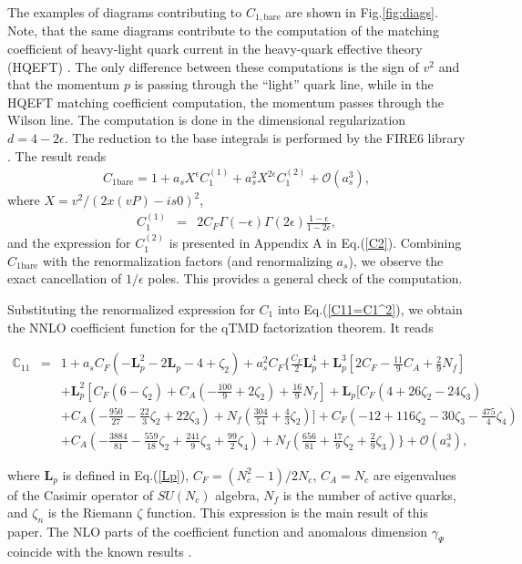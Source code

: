 \documentclass[aps,prl,twocolumn,secnumarabic,notitlepage,superscriptaddress,nofootinbib,tightenlines,floatfix,preprintnumbers]{revtex4-1}
\newcommand{\nn}{\nonumber}
\renewcommand{\(}{\left(}
\renewcommand{\)}{\right)}
\renewcommand{\[}{\left[}
\renewcommand{\]}{\right]}
\begin{document}
The examples of diagrams contributing to $C_{1,\text{bare}}$ are shown in Fig.\ref{fig:diags}. Note, that the same diagrams contribute to the computation of the matching coefficient of heavy-light quark current in the heavy-quark effective theory (HQEFT) \cite{Broadhurst:1994se}. The only difference between these computations is the sign of $v^2$ and that the momentum $p$ is passing through the ``light'' quark line, while in the HQEFT matching coefficient computation, the momentum passes through the Wilson line. The computation is done in the dimensional regularization $d=4-2\epsilon$. The reduction to the base integrals is performed by the FIRE6 library \cite{Smirnov:2019qkx}. The result reads
\begin{eqnarray}\label{bareC1}
C_{1\text{bare}}=1+a_s X^\epsilon C_1^{(1)}+a_s^2 X^{2\epsilon} C_1^{(2)}+\mathcal{O}(a_s^3),
\end{eqnarray}
where $X=v^2/(2x(vP)-is0)^2$, 
\begin{eqnarray}\label{C1}
C_1^{(1)}&=&2 C_F\Gamma(-\epsilon)\Gamma(2\epsilon)\frac{1-\epsilon}{1-2\epsilon},
\end{eqnarray}
and the expression for $C_1^{(2)}$ is presented in Appendix A in Eq.(\ref{C2}). Combining $C_{1\text{bare}}$ with the renormalization factors (and renormalizing $a_s$), we observe the exact cancellation of $1/\epsilon$ poles. This provides a general check of the computation.

Substituting the renormalized expression for $C_1$ into Eq.(\ref{C11=C1^2}), we obtain the NNLO coefficient function for the qTMD factorization theorem. It reads
\begin{widetext}
\begin{eqnarray}\label{NNLO}
\mathbb{C}_{11}&=&1+a_sC_F\(-\mathbf{L}_p^2-2\mathbf{L}_p-4+\zeta_2\)+
a_s^2C_F\Bigg\{\frac{C_F}{2}\mathbf{L}_p^4 + \mathbf{L}_p^3
\[2C_F-\frac{11}{9}C_A+\frac{2}{9}N_f\]
\\\nn &&
+\mathbf{L}_p^2\[
C_F\(6-\zeta_2\)+C_A\(-\frac{100}{9}+2\zeta_2\)+\frac{16}{9}N_f\]
+\mathbf{L}_p\Big[C_F\(4+26\zeta_2-24\zeta_3\)
\\\nn && +C_A\(-\frac{950}{27}-\frac{22}{3}\zeta_2+22\zeta_3\) 
+N_f\(\frac{304}{54}+\frac{4}{3}\zeta_2\)\Big]
+C_F\(-12+116\zeta_2-30\zeta_3-\frac{475}{4}\zeta_4\) 
\\\nn &&
+C_A\(-\frac{3884}{81}-\frac{559}{18}\zeta_2+\frac{241}{9}\zeta_3+\frac{99}{2}\zeta_4\)
+N_f\(\frac{656}{81}+\frac{17}{9}\zeta_2+\frac{2}{9}\zeta_3\)\Bigg\}+\mathcal{O}(a_s^3),
\end{eqnarray}
\end{widetext}
where $\mathbf{L}_p$ is defined in Eq.(\ref{Lp}), $C_F=(N^2_c-1)/2N_c$, $C_A=N_c$ are eigenvalues of the Casimir operator of $SU(N_c)$ algebra, $N_f$ is the number of active quarks, and $\zeta_n$ is the Riemann $\zeta$ function. This expression is the main result of this paper. The NLO parts of the coefficient function and anomalous dimension $\gamma_\Psi$ coincide with the known results \cite{Ebert:2018gzl, Vladimirov:2020ofp}.
\end{document}

